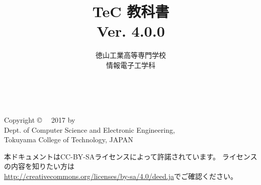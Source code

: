 \documentclass[a4paper,twocolumn,twoside,dvipdfmx]{jsbook}
\begin{document}
\frontmatter
\title{TeC 教科書\\Ver. 4.0.0}
\author{徳山工業高等専門学校\\情報電子工学科}
\date{}

\maketitle

\thispagestyle{empty}
\onecolumn
~
\vfill
\begin{flushleft}
Copyright \copyright ~~ 2017 by \\
Dept. of Computer Science and Electronic Engineering, \\
Tokuyama College of Technology, JAPAN
\end{flushleft}

\vspace{0.8cm}
本ドキュメントはCC-BY-SAライセンスによって許諾されています。
ライセンスの内容を知りたい方は\\
\url{http://creativecommons.org/licenses/by-sa/4.0/deed.ja}でご確認ください。

\setcounter{tocdepth}{2}
\tableofcontents

\twocolumn
\mainmatter

\appendix

\backmatter
\pagestyle{empty}
\onecolumn
~
\vfill\vfill\vfill
\begin{center}
\end{center}
\vfill
\end{document}

